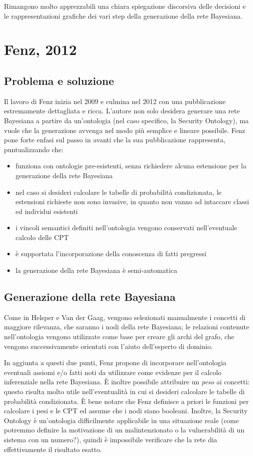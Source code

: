 Rimangono molto apprezzabili una chiara spiegazione discorsiva delle decisioni e le rappresentazioni grafiche dei vari step della generazione della rete Bayesiana.


\clearpage
\section{Fenz, 2012}
\subsection{Problema e soluzione}
Il lavoro di Fenz inizia nel 2009\cite{fenz2009} e culmina nel 2012\cite{fenz2012} con una pubblicazione estremamente dettagliata e ricca. L'autore non solo desidera generare una rete Bayesiana a partire da un'ontologia (nel caso specifico, la Security Ontology\cite{securityontology}), ma vuole che la generazione avvenga nel modo più semplice e lineare possibile. Fenz pone forte enfasi sul passo in avanti che la sua pubblicazione rappresenta, puntualizzando che\cite{fenz2012}:
\begin{itemize}
	\item funziona con ontologie pre-esistenti, senza richiedere alcuna estensione per la generazione della rete Bayesiana
	\item nel caso si desideri calcolare le tabelle di probabilità condizionata, le estensioni richieste non sono invasive, in quanto non vanno ad intaccare classi ed individui esistenti
	\item i vincoli semantici definiti nell'ontologia vengono conservati nell'eventuale calcolo delle CPT
	\item è supportata l'incorporazione della conoscenza di fatti pregressi
	\item la generazione della rete Bayesiana è semi-automatica
\end{itemize}

\subsection{Generazione della rete Bayesiana}
Come in Helsper e Van der Gaag\cite{helsper2002}, vengono selezionati manualmente i concetti di maggiore rilevanza, che saranno i nodi della rete Bayesiana; le relazioni contenute nell'ontologia vengono utilizzate come base per creare gli archi del grafo, che vengono successivamente orientati con l'aiuto dell'esperto di dominio.

In aggiunta a questi due punti, Fenz propone di incorporare nell'ontologia eventuali assiomi e/o fatti noti da utilizzare come evidenze per il calcolo inferenziale nella rete Bayesiana. È inoltre possibile attribuire un \textit{peso} ai concetti: questo risulta molto utile nell'eventualità in cui si desideri calcolare le tabelle di probabilità condizionata.
È bene notare che Fenz definisce a priori le funzioni per calcolare i pesi e le CPT ed assume che i nodi siano booleani. Inoltre, la Security Ontology è un'ontologia difficilmente applicabile in una situazione reale (come potremmo definire la motivazione di un malintenzionato o la vulnerabilità di un sistema con un numero?), quindi è impossibile verificare che la rete dia effettivamente il risultato esatto.


